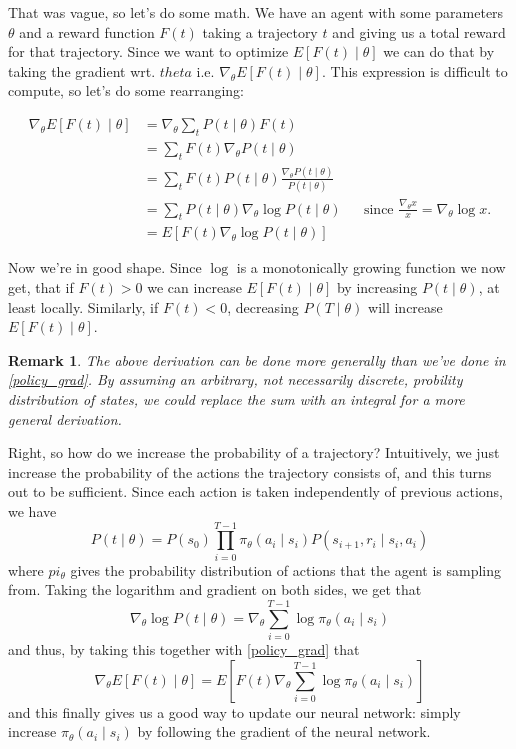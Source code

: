 \documentclass{article}
\theoremstyle{changedot}
\theoremstyle{changedotbreak}
\theoremstyle{nonumberplain}
\newtheorem{remark}{Remark}
\begin{document}
That was vague, so let's do some math. We have an agent with some parameters $\theta$ and a reward function $F(t)$ taking a trajectory $t$ and giving us a total reward for that trajectory. Since we want to optimize $E[F(t) \mid \theta]$ we can do that by taking the gradient wrt. $theta$ i.e. $\nabla_{\theta} E[F(t) \mid \theta]$. This expression is difficult to compute, so let's do some rearranging:

\begin{equation} \label{policy_grad}
\begin{aligned}
  \nabla_{\theta} E[F(t) \mid \theta] &= \nabla_{\theta} \sum_{t}P(t \mid \theta) F(t) \\
                                      &= \sum_{t} F(t) \nabla_{\theta} P(t \mid \theta)  \\
                                      &= \sum_{t} F(t) P(t \mid \theta) \frac{\nabla_{\theta} P(t \mid \theta)}{P(t \mid \theta)} \\
                                      &= \sum_{t} P(t \mid \theta) \nabla_{\theta} \log P(t \mid \theta) && \text{since $\frac{\nabla_{\theta} x}{x} = \nabla_{\theta} \log x$.} \\
                                      &= E[F(t) \nabla_{\theta} \log P(t \mid \theta)]
\end{aligned}
\end{equation}

Now we're in good shape. Since $\log$ is a monotonically growing function we now get, that if $F(t) > 0$ we can increase $E[F(t) \mid \theta]$ by increasing $P(t \mid \theta)$, at least locally. Similarly, if $F(t) < 0$, decreasing $P(T \mid \theta)$ will increase $E[F(t) \mid \theta]$.

\begin{remark}
  The above derivation can be done more generally than we've done in \ref{policy_grad}. By assuming an arbitrary, not necessarily discrete, probility distribution of states, we could replace the sum with an integral for a more general derivation.
\end{remark}

Right, so how do we increase the probability of a trajectory? Intuitively, we just increase the probability of the actions the trajectory consists of, and this turns out to be sufficient. Since each action is taken independently of previous actions, we have \[P(t \mid \theta) = P(s_{0}) \prod_{i=0}^{T-1} \pi_{\theta}(a_{i} \mid s_{i}) P(s_{i+1}, r_{i} \mid s_{i}, a_{i})\] where $pi_{\theta}$ gives the probability distribution of actions that the agent is sampling from. Taking the logarithm and gradient on both sides, we get that \[\nabla_{\theta} \log P(t \mid \theta) = \nabla_{\theta} \sum_{i=0}^{T-1} \log \pi_{\theta}(a_{i} \mid s_{i})\] and thus, by taking this together with \ref{policy_grad} that \[\nabla_{\theta} E[F(t) \mid \theta] = E\left[ F(t) \nabla_{\theta} \sum_{i=0}^{T-1} \log \pi_{\theta} (a_{i} \mid s_{i}) \right]\] and this finally gives us a good way to update our neural network: simply increase $\pi_{\theta} (a_{i} \mid s_{i})$ by following the gradient of the neural network.
\end{document}
